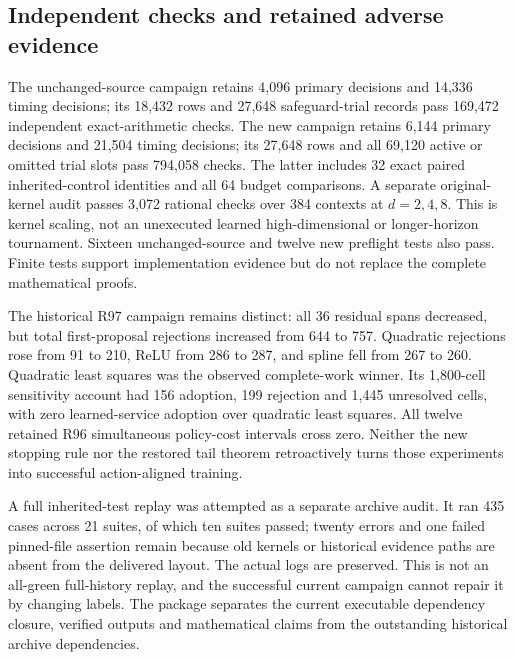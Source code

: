 \subsection{Independent checks and retained adverse evidence}
The unchanged-source campaign retains 4,096 primary decisions and 14,336 timing decisions; its 18,432 rows and 27,648 safeguard-trial records pass 169,472 independent exact-arithmetic checks. The new campaign retains 6,144 primary decisions and 21,504 timing decisions; its 27,648 rows and all 69,120 active or omitted trial slots pass 794,058 checks. The latter includes 32 exact paired inherited-control identities and all 64 budget comparisons. A separate original-kernel audit passes 3,072 rational checks over 384 contexts at $d=2,4,8$. This is kernel scaling, not an unexecuted learned high-dimensional or longer-horizon tournament. Sixteen unchanged-source and twelve new preflight tests also pass. Finite tests support implementation evidence but do not replace the complete mathematical proofs.

The historical R97 campaign remains distinct: all 36 residual spans decreased, but total first-proposal rejections increased from 644 to 757. Quadratic rejections rose from 91 to 210, ReLU from 286 to 287, and spline fell from 267 to 260. Quadratic least squares was the observed complete-work winner. Its 1,800-cell sensitivity account had 156 adoption, 199 rejection and 1,445 unresolved cells, with zero learned-service adoption over quadratic least squares. All twelve retained R96 simultaneous policy-cost intervals cross zero. Neither the new stopping rule nor the restored tail theorem retroactively turns those experiments into successful action-aligned training.

A full inherited-test replay was attempted as a separate archive audit. It ran 435 cases across 21 suites, of which ten suites passed; twenty errors and one failed pinned-file assertion remain because old kernels or historical evidence paths are absent from the delivered layout. The actual logs are preserved. This is not an all-green full-history replay, and the successful current campaign cannot repair it by changing labels. The package separates the current executable dependency closure, verified outputs and mathematical claims from the outstanding historical archive dependencies.
